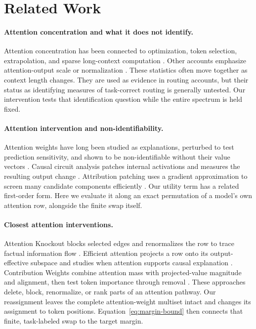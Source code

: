 \documentclass[letterpaper]{article} %
\begin{document}
\section{Related Work}

\paragraph{Attention concentration and what it does not identify.}
Attention concentration has been connected to optimization, token selection, extrapolation, and sparse
long-context computation \citep{maxmarginselection,nopeentropy,ssmax,sparselong}. Other accounts emphasize
attention-output scale or normalization \citep{vanishingvariance,postnorm}. These statistics often move
together as context length changes. They are used as evidence in routing accounts, but their status as
identifying measures of task-correct routing is generally untested. Our intervention tests that identification
question while the entire spectrum is held fixed.

\paragraph{Attention intervention and non-identifiability.}
Attention weights have long been studied as explanations, perturbed to test prediction sensitivity, and
shown to be non-identifiable without their value vectors
\citep{jainwallace2019,wiegreffepinter2019,brunner2020identifiability,kobayashi2020weight,hassid2022papa}.
Causal circuit analysis patches internal activations and measures the resulting output change
\citep{yamakoshi2023causal,conmy2023acdc}. Attribution patching uses a gradient approximation to screen many
candidate components efficiently \citep{syed2023attribution,kramar2024atp}. Our utility term has a related
first-order form. Here we evaluate it along an exact permutation of a model's own attention row, alongside the
finite swap itself.

\paragraph{Closest attention interventions.}
Attention Knockout blocks selected edges and renormalizes the row to trace factual information flow
\citep{geva2023dissecting}. Efficient attention projects a row onto its output-effective subspace and studies
when attention supports causal explanation \citep{naim2024explaining}. Contribution Weights combine attention
mass with projected-value magnitude and alignment, then test token importance through removal
\citep{cunningham2026contribution}. These approaches delete, block, renormalize, or rank parts of an attention
pathway. Our reassignment leaves the complete attention-weight multiset intact and changes its assignment to
token positions. Equation~\ref{eq:margin-bound} then connects that finite, task-labeled swap to the target margin.
\end{document}
